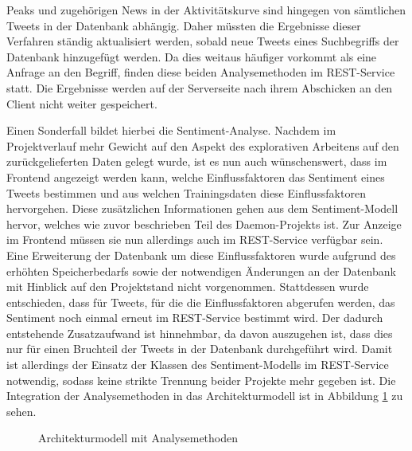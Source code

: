 Peaks und zugehörigen News in der Aktivitätskurve sind hingegen von sämtlichen Tweets in der Datenbank abhängig. Daher müssten die Ergebnisse dieser Verfahren ständig aktualisiert werden, sobald neue Tweets eines Suchbegriffs der Datenbank hinzugefügt werden. Da dies weitaus häufiger vorkommt als eine Anfrage an den Begriff, finden diese beiden Analysemethoden im REST-Service statt. Die Ergebnisse werden auf der Serverseite nach ihrem Abschicken an den Client nicht weiter gespeichert.

Einen Sonderfall bildet hierbei die Sentiment-Analyse. Nachdem im Projektverlauf mehr Gewicht auf den Aspekt des explorativen Arbeitens auf den zurückgelieferten Daten gelegt wurde, ist es nun auch wünschenswert, dass im Frontend angezeigt werden kann, welche Einflussfaktoren das Sentiment eines Tweets bestimmen und aus welchen Trainingsdaten diese Einflussfaktoren hervorgehen. Diese zusätzlichen Informationen gehen aus dem Sentiment-Modell hervor, welches wie zuvor beschrieben Teil des Daemon-Projekts ist. Zur Anzeige im Frontend müssen sie nun allerdings auch im REST-Service verfügbar sein. Eine Erweiterung der Datenbank um diese Einflussfaktoren wurde aufgrund des erhöhten Speicherbedarfs sowie der notwendigen Änderungen an der Datenbank mit Hinblick auf den Projektstand nicht vorgenommen. Stattdessen wurde entschieden, dass für Tweets, für die die Einflussfaktoren abgerufen werden, das Sentiment noch einmal erneut im REST-Service bestimmt wird. Der dadurch entstehende Zusatzaufwand ist hinnehmbar, da davon auszugehen ist, dass dies nur für einen Bruchteil der Tweets in der Datenbank durchgeführt wird. Damit ist allerdings der Einsatz der Klassen des Sentiment-Modells im REST-Service notwendig, sodass keine strikte Trennung beider Projekte mehr gegeben ist. Die Integration der Analysemethoden in das Architekturmodell ist in Abbildung \ref{arch3} zu sehen.

\begin{figure}[h]
\centering
\scalebox{0.7}{}
\caption{Architekturmodell mit Analysemethoden}
\label{arch3}
\end{figure}